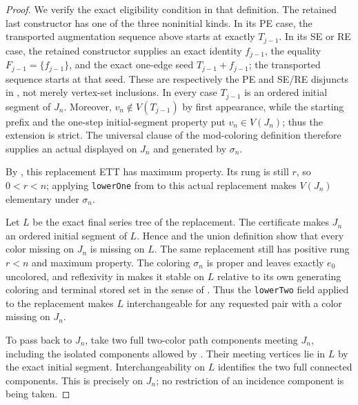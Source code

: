 \begin{proof}
We verify the exact eligibility condition in that definition.  The
retained last constructor has one of the three noninitial kinds.  In its
PE case, the transported augmentation sequence above starts at exactly
$T_{j-1}$.  In its SE or RE case, the retained constructor supplies an
exact identity $f_{j-1}$, the equality
$F_{j-1}=\{f_{j-1}\}$, and the exact one-edge seed
$T_{j-1}+f_{j-1}$; the transported sequence starts at that seed.  These
are respectively the PE and SE/RE disjuncts in
, not merely vertex-set inclusions.  In every case
$T_{j-1}$ is an ordered initial segment of $J_n$.  Moreover,
$v_n\notin V(T_{j-1})$ by first appearance, while the starting prefix and
the one-step initial-segment property put $v_n\in V(J_n)$; thus the
extension is strict.  The universal clause of the mod-coloring definition
therefore supplies an actual
 displayed on $J_n$ and
generated by $\sigma_n$.

By , this replacement ETT has maximum
property.  Its rung is still $r$, so $0<r<n$; applying
\texttt{lowerOne} from  to this actual
replacement makes $V(J_n)$ elementary under $\sigma_n$.

Let $L$ be the exact final series tree of the replacement.  The
 certificate makes $J_n$ an ordered initial
segment of $L$.  Hence  and the union
definition  show that every color missing on
$J_n$ is missing on $L$.  The same replacement still has positive rung
$r<n$ and maximum property.  The coloring $\sigma_n$ is proper and leaves
exactly $e_0$ uncolored, and reflexivity in  makes it stable
on $L$ relative to its own generating coloring and terminal stored set in
the sense of .  Thus the \texttt{lowerTwo} field
applied to the replacement makes $L$ interchangeable for any requested
pair with a color missing on $J_n$.

To pass back to $J_n$, take two full two-color path components meeting
$J_n$, including the isolated components allowed by
.  Their meeting vertices lie in $L$ by
the exact initial segment.  Interchangeability on $L$ identifies the two
full connected components.  This is precisely
 on $J_n$; no restriction of an incidence
component is being taken.


\end{proof}
